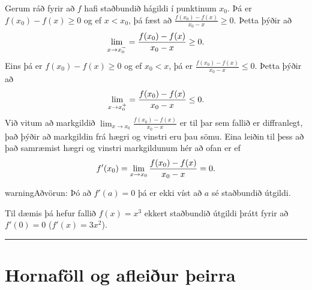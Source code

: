 \documentclass[a4paper,10pt,icelandic]{sphinxmanual}
\begin{document}
Gerum ráð fyrir að \(f\) hafi staðbundið hágildi í punktinum \(x_0\).
Þá er \(f(x_0)-f(x)\geq 0\) og ef \(x<x_0\),
þá fæst að  \(\frac{f(x_0)-f(x)}{x_0-x}\geq 0\). Þetta þýðir að
\begin{gather}
\begin{split}\lim_{x \to x_0^-} = \frac{f(x_0) - f(x)}{x_0-x} \geq 0.
    \label{vinstri}\end{split}\notag
\end{gather}
Eins þá er \(f(x_0)-f(x)\geq 0\) og ef \(x_0<x\),
þá er \(\frac{f(x_0)-f(x)}{x_0-x} \leq 0\).
Þetta þýðir að
\begin{gather}
\begin{split}\lim_{x \to x_0^+} = \frac{f(x_0) - f(x)}{x_0-x} \leq 0.
    \label{haegri}\end{split}\notag
\end{gather}
Við vitum að markgildið
\(\lim_{x\to x_0} \frac{f(x_0)-f(x)}{x_0-x}\) er til þar sem fallið
er diffranlegt, það þýðir að markgildin frá hægri og vinstri eru þau
sömu. Eina leiðin til þess að það samræmist hægri og vinstri markgildunum
hér að ofan er ef
\begin{gather}
\begin{split}f'(x_0) = \lim_{x\to x_0} \frac{f(x_0)-f(x)}{x_0-x} = 0.\end{split}\notag
\end{gather}
\begin{DUlineblock}{0em}
\item[] 
\item[] 
\end{DUlineblock}

\begin{notice}{warning}{Aðvörun:}
Þó að \(f'(a)=0\) þá er ekki víst að \(a\) sé staðbundið útgildi.

Til dæmis þá hefur fallið \(f(x) = x^3\) ekkert staðbundið útgildi
þrátt fyrir að \(f'(0) = 0\) (\(f'(x) = 3x^2\)).
\end{notice}


\bigskip\hrule{}\bigskip



\section{Hornaföll og afleiður þeirra}
\label{kafli03:hornafoll-og-afleiur-eirra}
\end{document}
